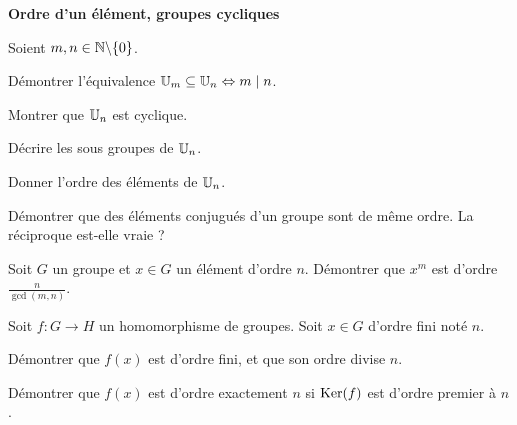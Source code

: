 \documentclass{report}
\begin{document}
\begin{center}
    \huge{\textbf{Ordre d'un élément, groupes cycliques}}
\end{center}

\begin{exo}
    Soient \(m,n\in\mathbb{N}\backslash\{0\}\).
    \begin{q}{1}
        Démontrer l'équivalence \(\mathbb{U}_m\subseteq \mathbb{U}_n \Leftrightarrow m\mid n\).
    \end{q}
    \begin{q}{2}
        Montrer que \(\mathbb{U}_n\) est cyclique.
    \end{q}
    \begin{q}{3}
        Décrire les sous groupes de \(\mathbb{U}_n\).
    \end{q}
    \begin{q}{4}
        Donner l'ordre des éléments de \(\mathbb{U}_n\).
    \end{q}
\end{exo}

\begin{exo}
    Démontrer que des éléments conjugués d'un groupe sont de même ordre. La réciproque
    est-elle vraie ?
\end{exo}

\begin{exo}
    Soit \(G\) un groupe et \(x\in G\) un élément d'ordre \(n\). Démontrer
    que \(x^m\) est d'ordre \(\frac{n}{\gcd(m,n)}\).
\end{exo}

\begin{exo}
    Soit \(f\colon G\to H\) un homomorphisme de groupes. Soit \(x\in G\) d'ordre
    fini noté \(n\).
    \begin{q}{1}
        Démontrer que \(f(x)\) est d'ordre fini, et que son ordre divise \(n\).
    \end{q}
    \begin{q}{2}
        Démontrer que \(f(x)\) est d'ordre exactement \(n\) si \(\operatorname{Ker}(f)\) est
        d'ordre premier à \(n\).
    \end{q}
\end{exo}
\end{document}

